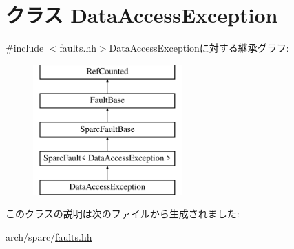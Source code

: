 \hypertarget{classSparcISA_1_1DataAccessException}{
\section{クラス DataAccessException}
\label{classSparcISA_1_1DataAccessException}
}


{\ttfamily \#include $<$faults.hh$>$}DataAccessExceptionに対する継承グラフ:\begin{figure}[H]
\begin{center}
\leavevmode
\includegraphics[height=5cm]{classSparcISA_1_1DataAccessException}
\end{center}
\end{figure}


このクラスの説明は次のファイルから生成されました:\begin{DoxyCompactItemize}
\item 
arch/sparc/\hyperlink{arch_2sparc_2faults_8hh}{faults.hh}\end{DoxyCompactItemize}
